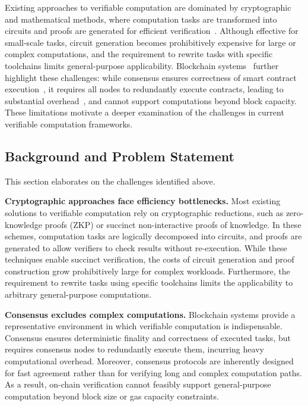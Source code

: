 \documentclass[3p]{elsarticle}
\theoremstyle{remark}
\begin{document}
Existing approaches to verifiable computation are dominated by cryptographic and mathematical methods, where computation tasks are transformed into circuits and proofs are generated for efficient verification~\cite{NOVA, Orion, transparentZK}. Although effective for small-scale tasks, circuit generation becomes prohibitively expensive for large or complex computations, and the requirement to rewrite tasks with specific toolchains limits general-purpose applicability. Blockchain systems~\cite{CEE-blockchain, CEE-blockchain-verify} further highlight these challenges: while consensus ensures correctness of smart contract execution~\cite{wood2014ethereum, taherdoost2023smart, CEE-blockchain-consensus, oliva2020exploratory}, it requires all nodes to redundantly execute contracts, leading to substantial overhead~\cite{consensussurvey, wang2019survey}, and cannot support computations beyond block capacity. These limitations motivate a deeper examination of the challenges in current verifiable computation frameworks.


\subsection{Background and Problem Statement}

This section elaborates on the challenges identified above.

\textbf{Cryptographic approaches face efficiency bottlenecks.}  
Most existing solutions to verifiable computation rely on cryptographic reductions, such as zero-knowledge proofs (ZKP) or succinct non-interactive proofs of knowledge. In these schemes, computation tasks are logically decomposed into circuits, and proofs are generated to allow verifiers to check results without re-execution. While these techniques enable succinct verification, the costs of circuit generation and proof construction grow prohibitively large for complex workloads. Furthermore, the requirement to rewrite tasks using specific toolchains limits the applicability to arbitrary general-purpose computations.

\textbf{Consensus excludes complex computations.}  
Blockchain systems provide a representative environment in which verifiable computation is indispensable. Consensus ensures deterministic finality and correctness of executed tasks, but requires consensus nodes to redundantly execute them, incurring heavy computational overhead. Moreover, consensus protocols are inherently designed for fast agreement rather than for verifying long and complex computation paths. As a result, on-chain verification cannot feasibly support general-purpose computation beyond block size or gas capacity constraints.
\end{document}
